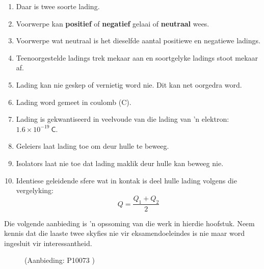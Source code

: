 \summary
\begin{enumerate}[noitemsep, label=\textbf{\arabic*}. ] 
\item Daar is twee soorte lading.
\item Voorwerpe kan \textbf{positief} of \textbf{negatief} gelaai of \textbf{neutraal} wees.
\item Voorwerpe wat neutraal is het dieselfde aantal positiewe en negatiewe ladings.
\item Teenoorgestelde ladings trek mekaar aan en soortgelyke ladings stoot mekaar af.
\item Lading kan nie geskep of vernietig word nie. Dit kan net oorgedra word.
\item Lading word gemeet in coulomb (C).
\item Lading is gekwantiseerd in veelvoude van die lading van 'n elektron: $1.6\times10^{-19}~\mathsf{C}$.
\item Geleiers laat lading toe om deur hulle te beweeg. 
\item Isolators laat nie toe dat lading maklik deur hulle kan beweeg nie.
\item Identiese geleidende sfere wat in kontak is deel hulle lading volgens die vergelyking:
\begin{equation*}
 Q=\frac{Q_1+Q_2}{2}
\end{equation*}
\end{enumerate}
        
Die volgende aanbieding is 'n opssoming van die werk in hierdie hoofstuk. Neem kennis dat die laaste twee skyfies nie vir eksamendoeleindes is nie maar word ingesluit vir interessantheid.
	\begin{figure}[H] %
    \label{m38781*slidesharemedia}\label{m38781*slideshareflash} { (Aanbieding:  P10073 )}
 \end{figure}       \par 
    \label{m38781*cid10}
            

